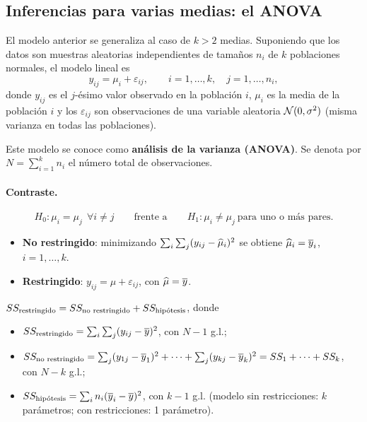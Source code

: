 \subsection{Inferencias para varias medias: el ANOVA}
\label{sec:t1-anova}

El modelo anterior se generaliza al caso de $k>2$ medias. Suponiendo que los datos son
muestras aleatorias independientes de tamaños $n_i$ de $k$ poblaciones normales, el modelo
lineal es
\[
  y_{ij} = \mu_i + \varepsilon_{ij}, \qquad i=1,\ldots,k,\quad j=1,\ldots,n_i,
\]
donde $y_{ij}$ es el $j$-ésimo valor observado en la población $i$, $\mu_i$ es la media de la
población $i$ y los $\varepsilon_{ij}$ son observaciones de una variable aleatoria
$\mathcal{N}(0,\sigma^2)$ (misma varianza en todas las poblaciones).

\begin{definicion}
  Este modelo se conoce como \textbf{análisis de la varianza (ANOVA)}. Se denota por
  $N=\sum_{i=1}^k n_i$ el número total de observaciones.
\end{definicion}

\paragraph{Contraste.}
\[
  H_0\colon \mu_i=\mu_j \ \ \forall i\neq j
  \qquad\text{frente a}\qquad
  H_1\colon \mu_i\neq\mu_j \ \text{para uno o más pares}.
\]
\begin{itemize}
  \item \textbf{No restringido}: minimizando $\sum_i\sum_j (y_{ij}-\widehat{\mu}_i)^2$ se obtiene
    $\widehat{\mu}_i=\overline{y}_i$, $i=1,\ldots,k$.
  \item \textbf{Restringido}: $y_{ij}=\mu+\varepsilon_{ij}$, con $\widehat{\mu}=\overline{y}$.
\end{itemize}

\begin{proposicion}
  $SS_{\text{restringido}} = SS_{\text{no restringido}} + SS_{\text{hipótesis}}$, donde
  \begin{itemize}
    \item $SS_{\text{restringido}} = \sum_i\sum_j (y_{ij}-\overline{y})^2$, con $N-1$ g.l.;
    \item $SS_{\text{no restringido}} = \sum_j (y_{1j}-\overline{y}_1)^2+\cdots+\sum_j (y_{kj}-\overline{y}_k)^2
      = SS_1+\cdots+SS_k$, con $N-k$ g.l.;
    \item $SS_{\text{hipótesis}} = \sum_i n_i(\overline{y}_i-\overline{y})^2$, con $k-1$ g.l. (modelo sin
      restricciones: $k$ parámetros; con restricciones: 1 parámetro).
  \end{itemize}
\end{proposicion}

